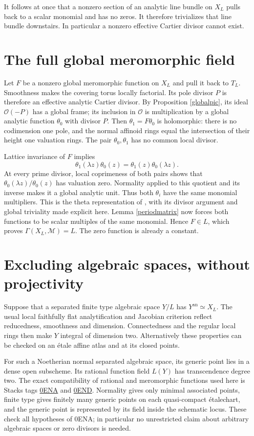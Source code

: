 \documentclass[11pt]{article}
\theoremstyle{remark}\newtheorem{remark}[theorem]{Remark}
\newcommand{\an}{\mathrm{an}}
\newcommand{\M}{\mathcal M}
\newcommand{\OO}{\mathcal O}
\newcommand{\Etale}{\'etale}
\begin{document}
It follows at once that a nonzero section of an analytic line bundle
on $X_L$ pulls back to a scalar monomial and has no zeros. It therefore
trivializes that line bundle downstairs. In particular a nonzero
effective Cartier divisor cannot exist.

\section{The full global meromorphic field}\label{mero}
Let $F$ be a nonzero global meromorphic function on $X_L$ and pull it
back to $T_L$. Smoothness makes the covering torus locally factorial.
Its pole divisor $P$ is therefore an effective analytic Cartier divisor.
By Proposition \ref{globalpic}, its ideal $\OO(-P)$ has a global frame;
its inclusion in $\OO$ is multiplication by a global analytic function
$\theta_0$ with divisor $P$. Then $\theta_1=F\theta_0$ is holomorphic:
there is no codimension one pole, and the normal affinoid rings equal
the intersection of their height one valuation rings. The pair
$\theta_0,\theta_1$ has no common local divisor.

Lattice invariance of $F$ implies
\[
 \theta_1(\lambda z)\theta_0(z)
       =\theta_1(z)\theta_0(\lambda z).
\]
At every prime divisor, local coprimeness of both pairs shows that
$\theta_0(\lambda z)/\theta_0(z)$ has valuation zero. Normality applied
to this quotient and its inverse makes it a global analytic unit.
Thus both $\theta_i$ have the same monomial multipliers. This is the
theta representation of \cite[4.3.1--4.3.4]{vdP}, with its divisor
argument and global triviality made explicit here. Lemma
\ref{periodmatrix} now forces both functions to be scalar multiples
of the same monomial. Hence $F\in L$, which proves
$\Gamma(X_L,\M)=L$. The zero function is already a constant.

\section{Excluding algebraic spaces, without projectivity}
Suppose that a separated finite type algebraic space $Y/L$ has
$Y^{\an}\simeq X_L$. The usual local faithfully flat analytification
and Jacobian criterion reflect reducedness, smoothness and dimension.
Connectedness and the regular local rings then make $Y$ integral of
dimension two. Alternatively these properties can be checked on an
\'etale affine atlas and at its closed points.

For such a Noetherian normal separated algebraic space, its generic
point lies in a dense open subscheme. Its rational function field
$L(Y)$ has transcendence degree two. The exact compatibility of rational
and meromorphic functions used here is Stacks tags
\href{https://stacks.math.columbia.edu/tag/0ENA}{0ENA} and
\href{https://stacks.math.columbia.edu/tag/0END}{0END}.
Normality gives only minimal associated points, finite type gives
finitely many generic points on each quasi-compact \Etale chart,
and the generic point is represented by its field inside the schematic
locus. These check all hypotheses of 0ENA; in particular no unrestricted
claim about arbitrary algebraic spaces or zero divisors is needed.
\end{document}
